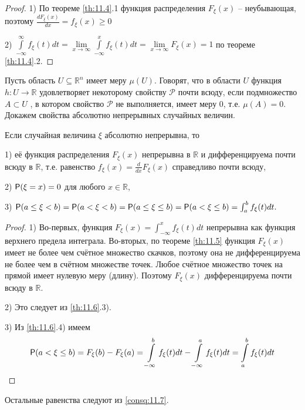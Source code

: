 \begin{proof}

1) По теореме \ref{th:11.4}.1 функция распределения $F_{\xi}(x)$ -- неубывающая, поэтому $\frac{dF_{\xi}(x)}{dx}=f_{\xi}(x) \geq 0$

2) $\int\limits_{-\infty}^{\infty}f_{\xi}(t)dt = \lim\limits_{x \to \infty}\int\limits_{-\infty}^{x}f_{\xi}(t)dt = \lim\limits_{x \to \infty}F_{\xi}(x) = 1$ по теореме \ref{th:11.4}.2.
\end{proof} 

\begin{definition}
 \label{def:12.4}

Пусть область $U \subseteq \mathbb{R}^n$ имеет меру $\mu(U )$. Говорят, что в области $U$ функция $h : U \to \mathbb{R}$ удовлетворяет некоторому свойству $\mathcal{P}$ почти всюду, если подмножество $A \subset U$ , в котором свойство $\mathcal{P}$ не выполняется, имеет меру 0, т.е. $\mu(A) = 0$.
Докажем свойства абсолютно непрерывных случайных величин.
\end{definition}

\begin{theorem}
 \label{th:12.5}

Если случайная величина $\xi$ абсолютно непрерывна, то

1) её функция распределения $F_{\xi}(x)$ непрерывна в $\mathbb{R}$ и дифференцируема почти всюду в $\mathbb{R}$, т.е. равенство $f_{\xi}(x) = \frac{d}{dx}F_{\xi}(x)$ справедливо почти всюду,

2) $\P(\xi = x) = 0$ для любого $x \in \mathbb{R}$,

3) $\P(a \leq \xi < b) = \P(a < \xi < b) = \P(a \leq \xi \leq b) = \P(a < \xi \leq b) = \int_{a}^{b}f_{\xi}(t)dt.$
\end{theorem}

\begin{proof}
1) Во-первых, функция $F_{\xi}(x) = \int_{-\infty}^{x}f_{\xi}(t)dt$ непрерывна как функция верхнего предела интеграла.
Во-вторых, по теореме \ref{th:11.5} функция $F_{\xi}(x)$ имеет не более чем счётное множество скачков, поэтому она не дифференцируема не более чем в счётном
множестве точек. Любое счётное множество точек на прямой имеет нулевую меру (длину). Поэтому $F_{\xi}(x)$ дифференцируема почти всюду в $\mathbb{R}$.

2) Это следует из \ref{th:11.6}.3).

3) Из \ref{th:11.6}.4) имеем
$$\P(a < \xi \leq b) = F_{\xi}(b) - F_{\xi}(a) = \int\limits_{-\infty}^{b}f_{\xi}(t)dt - \int\limits_{-\infty}^{a}f_{\xi}(t)dt = \int\limits_{a}^{b}f_{\xi}(t)dt$$

\end{proof}
Остальные равенства следуют из \ref{consq:11.7}.

